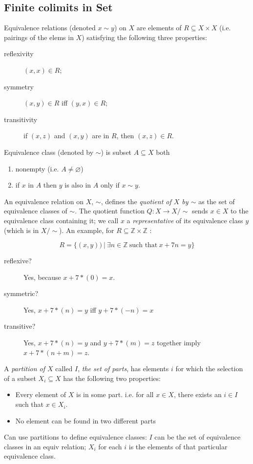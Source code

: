 \documentclass{article}
\begin{document}
\subsection{Finite colimits in Set}
Equivalence relations (denoted $x \sim y$) on $X$ are elements of $R \subseteq X \times X$ (i.e. pairings of the elems in $X$) satisfying the following three properties:
\begin{description}
\item[reflexivity] $(x,x) \in R$;
\item[symmetry] $(x,y) \in R$ iff $(y,x) \in R$;
\item[transitivity] if $(x,z)$ and $(x,y)$ are in $R$, then $(x,z)\in R$.
\end{description}
Equivalence class (denoted by $\sim$) is subset $A \subseteq X$ both
\begin{enumerate}
\item nonempty (i.e. $A \neq \varnothing$)
\item if $x$ in $A$ then $y$ is also in $A$ only if $x \sim y$. 
\end{enumerate}
An equivalence relation on $X$, $\sim$, defines the \emph{quotient of $X$ by $\sim$} as the set of equivalence classes of $\sim$. The quotient function $Q: X \rightarrow X/\sim$ sends $x \in X$ to the equivalence class containing it; we call $x$ a \emph{representative} of its equivalence class $y$ (which is in $X /\sim$).
An example, for $R \subseteq \mathbb{Z} \times \mathbb{Z}$ :

\begin{equation*}
R = \{ (x,y))\ |\ \exists n \in \mathbb{Z}\ \text{such that}\ x + 7n = y \}
\end{equation*}

\begin{description}
\item[reflexive?] Yes, because $x + 7 * (0) = x$.
\item[symmetric?] Yes, $x + 7 * (n) = y$ iff $y + 7 * (-n) = x$
\item[transitive?] Yes, $x + 7 * (n) = y$ and $y + 7 * (m) = z$ together imply $x + 7 * (n+m) = z$.
\end{description}
A \emph{partition of $X$} called $I$, \emph{the set of parts}, has elements $i$ for which the selection of a subset $X_i \subseteq X$ has the following two properties:
\begin{itemize}
\item Every element of $X$ is in some part. i.e. for all $x \in X$, there exists an $i \in I$ such that $x \in X_i$.
\item No element can be found in two different parts
\end{itemize}
Can use partitions to define equivalence classes: $I$ can be the set of equivalence classes in an equiv relation; $X_i$ for each $i$ is the elements of that particular equivalence class.
\end{document}

